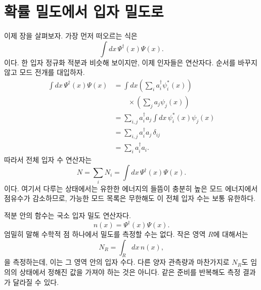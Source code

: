 \begin{classroomqa}
\end{classroomqa}

\begin{classroomqa}
\end{classroomqa}

\section{확률 밀도에서 입자 밀도로}

이제 장을 살펴보자. 가장 먼저 떠오르는 식은
\begin{equation}
\int dx\,\Psi^\dagger(x)\Psi(x).
\end{equation}
이다. 한 입자 정규화 적분과 비슷해 보이지만, 이제 인자들은 연산자다. 순서를 바꾸지 않고 모드 전개를 대입하자.
\begin{align}
\int dx\,\Psi^\dagger(x)\Psi(x)
&=\int dx
\left(\sum_i a_i^\dagger\psi_i^*(x)\right)\\
&\qquad\times\left(\sum_j a_j\psi_j(x)\right) \\
&=\sum_{i,j}a_i^\dagger a_j
\int dx\,\psi_i^*(x)\psi_j(x) \\
&=\sum_{i,j}a_i^\dagger a_j\,\delta_{ij} \\
&=\sum_i a_i^\dagger a_i.
\label{eq:l07-number-derivation}
\end{align}
따라서 전체 입자 수 연산자는
\begin{equation}
N=\sum_i N_i
=\int dx\,\Psi^\dagger(x)\Psi(x).
\label{eq:l07-total-number}
\end{equation}
이다. 여기서 다루는 상태에서는 유한한 에너지의 들뜸이 충분히 높은 모드 에너지에서 점유수가 감소하므로, 가능한 모드 목록은 무한해도 이 전체 입자 수는 보통 유한하다.

적분 안의 함수는 국소 입자 밀도 연산자다.
\begin{equation}
n(x)=\Psi^\dagger(x)\Psi(x).
\label{eq:l07-density}
\end{equation}
엄밀히 말해 수학적 점 하나에서 밀도를 측정할 수는 없다. 작은 영역 \(R\)에 대해서는
\begin{equation}
N_R=\int_R dx\,n(x),
\label{eq:l07-regional-number}
\end{equation}
을 측정하는데, 이는 그 영역 안의 입자 수다. 다른 양자 관측량과 마찬가지로 \(N_R\)도 임의의 상태에서 정해진 값을 가져야 하는 것은 아니다. 같은 준비를 반복해도 측정 결과가 달라질 수 있다.

